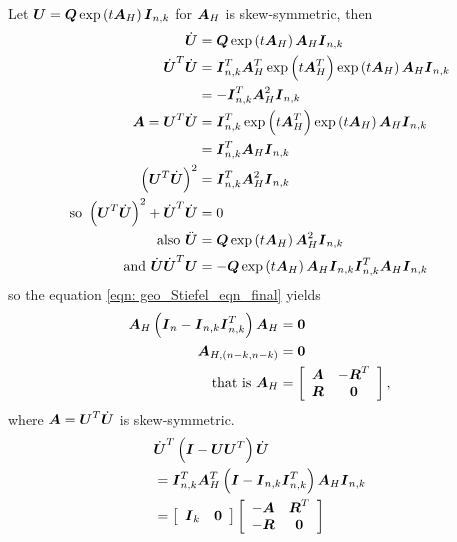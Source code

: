 \documentclass[11pt]{article}
\begin{document}
\begin{enumerate}
Let $\boldsymbol{U} = \boldsymbol{Q}\exp\left(t\boldsymbol{A}_{H}\right)\boldsymbol{I}_{n,k}$ for $\boldsymbol{A}_{H}$ is skew-symmetric, then 
\begin{align*}
\dot{\boldsymbol{U}}&=  \boldsymbol{Q}\exp\left(t\boldsymbol{A}_{H}\right)\boldsymbol{A}_{H}\boldsymbol{I}_{n,k}\\
\dot{\boldsymbol{U}}^{T}\dot{\boldsymbol{U}} &= \boldsymbol{I}_{n,k}^{T}\boldsymbol{A}_{H}^{T}\exp\left(t\boldsymbol{A}_{H}^{T}\right)\exp\left(t\boldsymbol{A}_{H}\right)\boldsymbol{A}_{H}\boldsymbol{I}_{n,k}\\
&= -\boldsymbol{I}_{n,k}^{T}\boldsymbol{A}_{H}^{2}\boldsymbol{I}_{n,k}\\
\boldsymbol{A} = \boldsymbol{U}^{T}\dot{\boldsymbol{U}} &=  \boldsymbol{I}_{n,k}^{T}\exp\left(t\boldsymbol{A}_{H}^{T}\right)\exp\left(t\boldsymbol{A}_{H}\right)\boldsymbol{A}_{H}\boldsymbol{I}_{n,k}\\
&=  \boldsymbol{I}_{n,k}^{T}\boldsymbol{A}_{H}\boldsymbol{I}_{n,k}\\
\left(\boldsymbol{U}^{T}\dot{\boldsymbol{U}}\right)^{2}   &= \boldsymbol{I}_{n,k}^{T}\boldsymbol{A}_{H}^{2}\boldsymbol{I}_{n,k}\\
\text{so } \left(\boldsymbol{U}^{T}\dot{\boldsymbol{U}}\right)^{2}   + \dot{\boldsymbol{U}}^{T}\dot{\boldsymbol{U}} &= 0\\
\text{also } \ddot{\boldsymbol{U}}&=  \boldsymbol{Q}\exp\left(t\boldsymbol{A}_{H}\right)\boldsymbol{A}_{H}^{2}\boldsymbol{I}_{n,k}\\
\text{and }  \dot{\boldsymbol{U}} \dot{\boldsymbol{U}}^{T}\boldsymbol{U} &= 
- \boldsymbol{Q}\exp\left(t\boldsymbol{A}_{H}\right)\boldsymbol{A}_{H}\boldsymbol{I}_{n,k}\boldsymbol{I}_{n,k}^{T}\boldsymbol{A}_{H}\boldsymbol{I}_{n,k} 
\end{align*}
so the equation \eqref{eqn: geo_Stiefel_eqn_final} yields 
\begin{align*}
 \boldsymbol{A}_{H}\left(\boldsymbol{I}_{n} - \boldsymbol{I}_{n,k}\boldsymbol{I}_{n,k}^{T}\right)\boldsymbol{A}_{H} &=\boldsymbol{0} \\
 \boldsymbol{A}_{H, (n-k, n-k)} &= \boldsymbol{0}\\
 \text{that is }
 \boldsymbol{A}_{H} &= \left[\begin{array}{cc}
\boldsymbol{A} & -\boldsymbol{R}^{T} \\ 
\boldsymbol{R}& \boldsymbol{0}
\end{array} \right],
\end{align*} where $\boldsymbol{A} = \boldsymbol{U}^{T}\dot{\boldsymbol{U}}$ is skew-symmetric.
\begin{align*}
&\dot{\boldsymbol{U}}^{T} \left( \boldsymbol{I} - \boldsymbol{U}\boldsymbol{U}^{T} \right)  \dot{\boldsymbol{U}}\\
&= \boldsymbol{I}_{n,k}^{T}\boldsymbol{A}_{H}^{T}\left(\boldsymbol{I} - \boldsymbol{I}_{n,k}\boldsymbol{I}_{n,k}^{T}  \right)\boldsymbol{A}_{H}\boldsymbol{I}_{n,k}\\
&= \left[\begin{array}{cc}
\boldsymbol{I}_{k} &
\boldsymbol{0}
\end{array} \right]
\left[\begin{array}{cc}
-\boldsymbol{A} & \boldsymbol{R}^{T} \\ 
-\boldsymbol{R}& \boldsymbol{0}

\end{array}\right]
\end{align*}
\end{enumerate}
\end{document}
